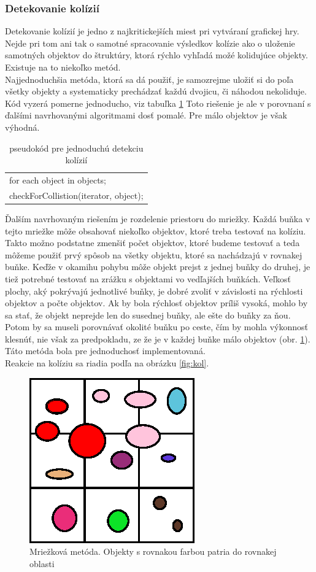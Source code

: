 \subsubsection{Detekovanie kolízií}
Detekovanie kolízií je jedno z najkritickejších miest pri vytváraní grafickej hry. Nejde pri tom ani tak o samotné spracovanie výsledkov kolízie ako o uloženie samotných objektov do štruktúry, ktorá rýchlo vyhľadá možé kolidujúce objekty. Existuje na to niekoľko metód.\\
Najjednoduchšia metóda, ktorá sa dá použiť, je samozrejme uložiť si do poľa všetky objekty a systematicky prechádzať každú dvojicu, či náhodou nekoliduje. Kód vyzerá pomerne jednoducho, viz tabuľka \ref{tab:k1} Toto riešenie je ale v porovnaní s ďalšími navrhovanými algoritmami dosť pomalé. Pre málo objektov je však výhodná.\\
\begin{table}
\centering
\begin{tabular}{|l|}
\hline
for each object in objects;\\
checkForCollistion(iterator, object);\\
\hline
\end{tabular}
\caption{pseudokód pre jednoduchú detekciu kolízií} %
\label{tab:k1}
\end{table}
\indent Ďalším navrhovaným riešením je rozdelenie priestoru do mriežky. Každá buňka v tejto mriežke môže obsahovať niekoľko objektov, ktoré treba testovať na kolíziu. Takto možno podstatne zmenšiť počet objektov, ktoré budeme testovať a teda môžeme použiť prvý spôsob na všetky objektu, ktoré sa nachádzajú v rovnakej buňke. Keďže v okamihu pohybu môže objekt prejst z jednej buňky do druhej, je tiež potrebné testovať na zrážku s objektami vo vedľajších buňkách. Veľkosť plochy, aký pokrývajú jednotlivé buňky, je dobré zvoliť v závislosti na rýchlosti objektov a počte objektov. Ak by bola rýchlosť objektov príliš vysoká, mohlo by sa stať, že objekt neprejde len do susednej buňky, ale ešte do buňky za ňou. Potom by sa museli porovnávať okolité buňku po ceste, čím by mohla výkonnosť klesnúť, nie však za predpokladu, ze že je v každej buňke málo objektov (obr. \ref{fig:hash}). Táto metóda bola pre jednoduchosť implementovaná.\\%
Reakcie na kolíziu sa riadia podľa na obrázku \ref{fig:kol}.\\
\begin{figure}
\centering
	\includegraphics[totalheight=0.2\textheight,width=.2\textwidth]{mriezka}
\caption { Mriežková metóda. Objekty s rovnakou farbou patria do rovnakej oblasti}
\label{fig:hash}
\end{figure}
